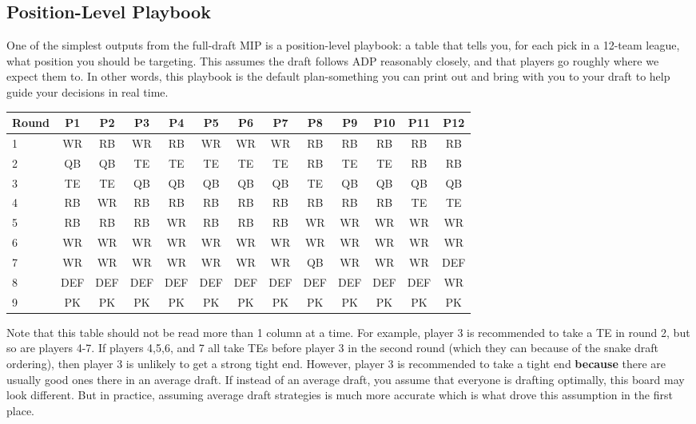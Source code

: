 \documentclass{article}
\begin{document}
\subsection{Position-Level Playbook}
One of the simplest outputs from the full-draft MIP is a position-level playbook: a table that tells you, for each pick in a 12-team league, what position you should be targeting.
This assumes the draft follows ADP reasonably closely, and that players go roughly where we expect them to.
In other words, this playbook is the default plan-something you can print out and bring with you to your draft to help guide your decisions in real time.

\begin{center}
\begin{tabular}{l|cccccccccccc}
\textbf{Round} & P1 & P2 & P3 & P4 & P5 & P6 & P7 & P8 & P9 & P10 & P11 & P12 \\
\hline
1 & WR & RB & WR & RB & WR & WR & WR & RB & RB & RB & RB & RB \\
2 & QB & QB & TE & TE & TE & TE & TE & RB & TE & TE & RB & RB \\
3 & TE & TE & QB & QB & QB & QB & QB & TE & QB & QB & QB & QB \\
4 & RB & WR & RB & RB & RB & RB & RB & RB & RB & RB & TE & TE \\
5 & RB & RB & RB & WR & RB & RB & RB & WR & WR & WR & WR & WR \\
6 & WR & WR & WR & WR & WR & WR & WR & WR & WR & WR & WR & WR \\
7 & WR & WR & WR & WR & WR & WR & WR & QB & WR & WR & WR & DEF \\
8 & DEF & DEF & DEF & DEF & DEF & DEF & DEF & DEF & DEF & DEF & DEF & WR \\
9 & PK & PK & PK & PK & PK & PK & PK & PK & PK & PK & PK & PK \\
\end{tabular}
\end{center}

Note that this table should not be read more than 1 column at a time.  For example, player 3 is recommended to take a TE in round 2, but so are players 4-7.
If players 4,5,6, and 7 all take TEs before player 3 in the second round (which they can because of the snake draft ordering), then player 3 is unlikely to get a strong tight end.
However, player 3 is recommended to take a tight end \textbf{because} there are usually good ones there in an average draft.
If instead of an average draft, you assume that everyone is drafting optimally, this board may look different.
But in practice, assuming average draft strategies is much more accurate which is what drove this assumption in the first place.
\end{document}
